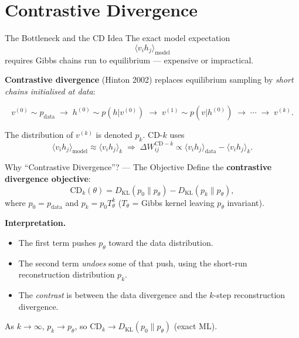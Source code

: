 \documentclass[aspectratio=169]{beamer}
\newcommand{\pdata}{p_{\mathrm{data}}}
\newcommand{\pmodel}{p_{\theta}}
\newcommand{\DKL}{D_{\mathrm{KL}}}
\begin{document}
\section{Contrastive Divergence}

\begin{frame}{The Bottleneck and the CD Idea}
The exact model expectation
\[
  \langle v_i h_j\rangle_{\mathrm{model}}
\]
requires Gibbs chains run to equilibrium — expensive or impractical.

\medskip
\textbf{Contrastive divergence} (Hinton 2002) replaces equilibrium sampling by
\emph{short chains initialised at data}:

\[
  v^{(0)}\!\sim\pdata
  \;\to\; h^{(0)}\!\sim p(h|v^{(0)})
  \;\to\; v^{(1)}\!\sim p(v|h^{(0)})
  \;\to\; \cdots
  \;\to\; v^{(k)}.
\]

The distribution of $v^{(k)}$ is denoted $p_k$.  CD-$k$ uses
\[
  \langle v_i h_j\rangle_{\mathrm{model}}
  \approx \langle v_i h_j\rangle_{k}
  \;\Longrightarrow\;
  \Delta W_{ij}^{\mathrm{CD-}k}
  \propto
  \langle v_i h_j\rangle_{\mathrm{data}}
  -
  \langle v_i h_j\rangle_{k}.
\]
\end{frame}

\begin{frame}{Why ``Contrastive Divergence''? — The Objective}
Define the \textbf{contrastive divergence objective}:
\[
  \mathrm{CD}_k(\theta)
  = \DKL(p_0\|\pmodel)
    - \DKL(p_k\|\pmodel),
\]
where $p_0 = \pdata$ and $p_k = p_0 T_\theta^k$ ($T_\theta$ = Gibbs kernel leaving
$\pmodel$ invariant).

\medskip
\textbf{Interpretation.}
\begin{itemize}
  \item The first term pushes $\pmodel$ toward the data distribution.
  \item The second term \emph{undoes} some of that push, using
        the short-run reconstruction distribution $p_k$.
  \item The \emph{contrast} is between the data divergence and the $k$-step
        reconstruction divergence.
\end{itemize}

As $k\to\infty$, $p_k\to\pmodel$, so $\mathrm{CD}_k\to\DKL(p_0\|\pmodel)$ (exact ML).
\end{frame}
\end{document}
